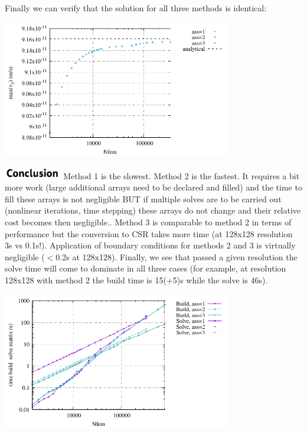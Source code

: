 Finally we can verify that the solution for all three methods is identical:
\begin{center}
\includegraphics[width=10cm]{python_codes/fieldstone_181/RESULTS/vy}
\end{center}




\noindent \includegraphics[width=2.5cm]{./images/conclusion.png}
Method 1 is the slowest. 
Method 2 is the fastest. It requires a bit more work (large additional arrays need to be 
declared and filled) and the time to fill these arrays is not negligible BUT if 
multiple solves are to be carried out (nonlinear iterations, time stepping) these 
arrays do not change and their relative cost becomes then negligible.. 
Method 3 is comparable to method 2 in terms of performance but the conversion to CSR
takes more time (at 128x128 resolution 3s vs 0.1s!). 
Application of boundary conditions for methods 2 and 3 is virtually negligible ($<$0.2s
at 128x128).
Finally, we see that passed a given resolution the solve time will 
come to dominate in all three cases (for example, at resolution 128x128 with method 2
the build time is 15(+5)s while the solve is 46s). 

\begin{center}
\includegraphics[width=10cm]{python_codes/fieldstone_181/RESULTS/times_build_solve.pdf}
\end{center}


 


